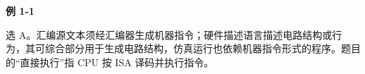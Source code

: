 {\color{ink}\bfseries 例 1-1}\par\vspace{1bp}选 A。汇编源文本须经汇编器生成机器指令；硬件描述语言描述电路结构或行为，其可综合部分用于生成电路结构，仿真运行也依赖机器指令形式的程序。题目的“直接执行”指 CPU 按 ISA 译码并执行指令。

